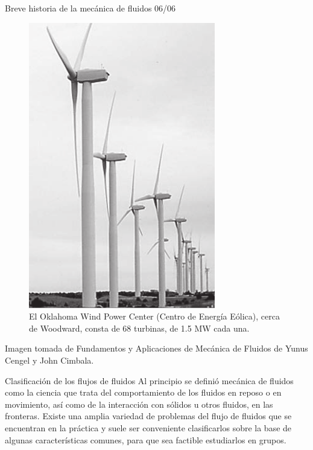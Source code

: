 \begin{frame}{Breve historia de la mecánica de fluidos 06/06}
\justifying
\begin{figure}[H]
\centering
\includegraphics[scale=0.25]{Section_Files/imagenes/sec01_0101_Fig01-16.png}
\caption{El Oklahoma Wind Power Center (Centro de Energía Eólica), cerca de Woodward, consta de 68 turbinas, de 1.5 MW cada una.}
\label{fig: Figura1-16}
\end{figure}
Imagen tomada de Fundamentos y Aplicaciones de Mecánica de Fluidos de Yunus Cengel y John Cimbala.
\end{frame}




\begin{frame}{Clasificación de los flujos de fluidos}
\justifying
Al principio se definió mecánica de fluidos como la ciencia que trata del comportamiento de los fluidos en reposo o en movimiento, así como de la interacción con sólidos u otros fluidos, en las fronteras. Existe una amplia variedad de problemas del flujo de fluidos que se encuentran en la práctica y suele ser conveniente clasificarlos sobre la base de algunas características comunes, para que sea factible estudiarlos en grupos.
\end{frame}

